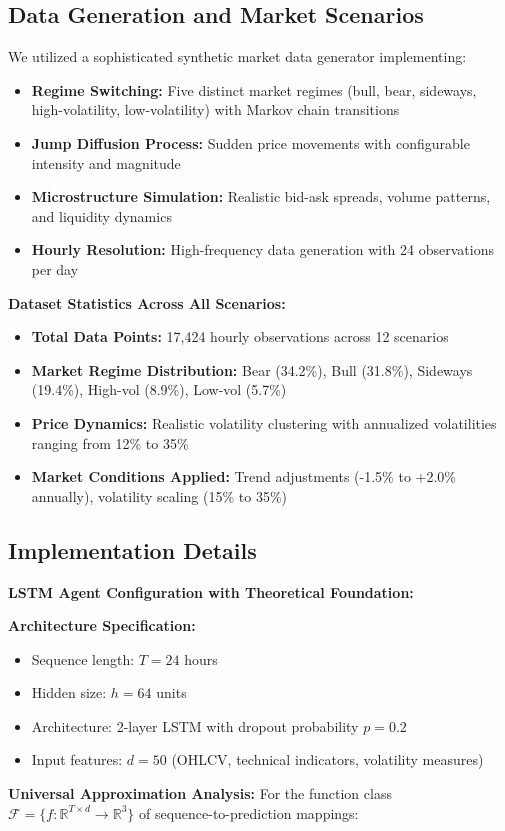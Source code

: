 \documentclass[11pt,a4paper]{article}
\begin{document}
\subsection{Data Generation and Market Scenarios}

We utilized a sophisticated synthetic market data generator implementing:
\begin{itemize}
\item \textbf{Regime Switching:} Five distinct market regimes (bull, bear, sideways, high-volatility, low-volatility) with Markov chain transitions
\item \textbf{Jump Diffusion Process:} Sudden price movements with configurable intensity and magnitude
\item \textbf{Microstructure Simulation:} Realistic bid-ask spreads, volume patterns, and liquidity dynamics
\item \textbf{Hourly Resolution:} High-frequency data generation with 24 observations per day

\end{itemize}
\textbf{Dataset Statistics Across All Scenarios:}
\begin{itemize}
\item \textbf{Total Data Points:} 17,424 hourly observations across 12 scenarios
\item \textbf{Market Regime Distribution:} Bear (34.2\%), Bull (31.8\%), Sideways (19.4\%), High-vol (8.9\%), Low-vol (5.7\%)
\item \textbf{Price Dynamics:} Realistic volatility clustering with annualized volatilities ranging from 12\% to 35\%
\item \textbf{Market Conditions Applied:} Trend adjustments (-1.5\% to +2.0\% annually), volatility scaling (15\% to 35\%)

\end{itemize}
\subsection{Implementation Details}

\textbf{LSTM Agent Configuration with Theoretical Foundation:}

\textbf{Architecture Specification:}
\begin{itemize}
\item Sequence length: $T = 24$ hours
\item Hidden size: $h = 64$ units  
\item Architecture: 2-layer LSTM with dropout probability $p = 0.2$
\item Input features: $d = 50$ (OHLCV, technical indicators, volatility measures)

\end{itemize}
\textbf{Universal Approximation Analysis:}
For the function class $\mathcal{F} = \{f: \mathbb{R}^{T \times d} \to \mathbb{R}^3\}$ of sequence-to-prediction mappings:
\end{document}
